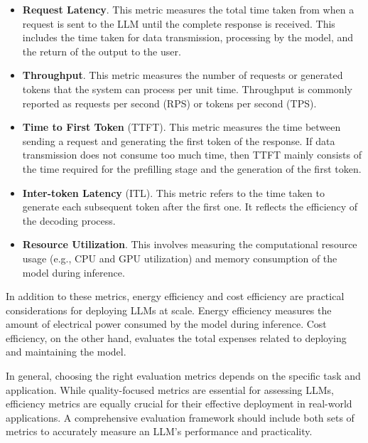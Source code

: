 \begin{itemize}
\item \vspace{0.5em} \textbf{Request Latency}. This metric measures the total time taken from when a request is sent to the LLM until the complete response is received. This includes the time taken for data transmission, processing by the model, and the return of the output to the user.
\item \vspace{0.3em} \textbf{Throughput}. This metric measures the number of requests or generated tokens that the system can process per unit time. Throughput is commonly reported as requests per second (RPS) or tokens per second (TPS).
\item \vspace{0.3em} \textbf{Time to First Token} (TTFT). This metric measures the time between sending a request and generating the first token of the response. If data transmission does not consume too much time, then TTFT mainly consists of the time required for the prefilling stage and the generation of the first token.
\item \vspace{0.3em} \textbf{Inter-token Latency} (ITL). This metric refers to the time taken to generate each subsequent token after the first one. It reflects the efficiency of the decoding process.
\item \vspace{0.3em} \textbf{Resource Utilization}. This involves measuring the computational resource usage (e.g., CPU and GPU utilization) and memory consumption of the model during inference.
\end{itemize}
\vspace{0.5em}

In addition to these metrics, energy efficiency and cost efficiency are practical considerations for deploying LLMs at scale. Energy efficiency measures the amount of electrical power consumed by the model during inference. Cost efficiency, on the other hand, evaluates the total expenses related to deploying and maintaining the model.

In general, choosing the right evaluation metrics depends on the specific task and application. While quality-focused metrics are essential for assessing LLMs, efficiency metrics are equally crucial for their effective deployment in real-world applications. A comprehensive evaluation framework should include both sets of metrics to accurately measure an LLM's performance and practicality.

